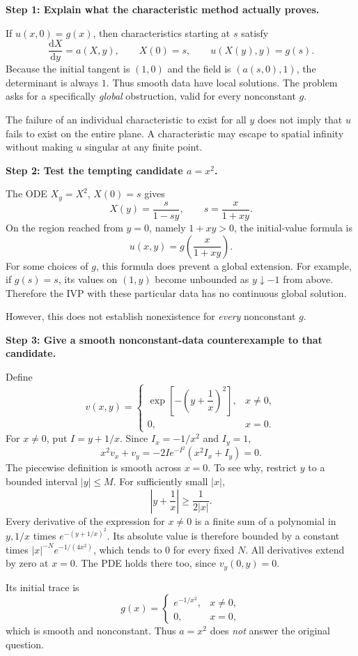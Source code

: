 \documentclass[11pt,a4paper]{article}
\newcommand{\step}[1]{\par\medskip\textbf{#1}\par}
\begin{document}
\step{Step 1: Explain what the characteristic method actually proves.}
If $u(x,0)=g(x)$, then characteristics starting at $s$ satisfy
\[
 \frac{\mathrm dX}{\mathrm dy}=a(X,y),\qquad X(0)=s,
 \qquad u(X(y),y)=g(s).
\]
Because the initial tangent is $(1,0)$ and the field is $(a(s,0),1)$, the determinant is always $1$. Thus smooth data have local solutions. The problem asks for a specifically \emph{global} obstruction, valid for every nonconstant $g$.

The failure of an individual characteristic to exist for all $y$ does not imply that $u$ fails to exist on the entire plane. A characteristic may escape to spatial infinity without making $u$ singular at any finite point.

\step{Step 2: Test the tempting candidate $a=x^2$.}
The ODE $X_y=X^2$, $X(0)=s$ gives
\[
 X(y)=\frac{s}{1-sy},\qquad
 s=\frac{x}{1+xy}.
\]
On the region reached from $y=0$, namely $1+xy>0$, the initial-value formula is
\[
 u(x,y)=g\!\left(\frac{x}{1+xy}\right).
\]
For some choices of $g$, this formula does prevent a global extension. For example, if $g(s)=s$, its values on $(1,y)$ become unbounded as $y\downarrow-1$ from above. Therefore the IVP with these particular data has no continuous global solution.

However, this does not establish nonexistence for \emph{every} nonconstant $g$.

\step{Step 3: Give a smooth nonconstant-data counterexample to that candidate.}
Define
\[
 v(x,y)=\begin{cases}
 \exp\!\left[-\left(y+\dfrac1x\right)^2\right],&x\ne0,\\[3pt]
 0,&x=0.
 \end{cases}
\]
For $x\ne0$, put $I=y+1/x$. Since $I_x=-1/x^2$ and $I_y=1$,
\[
 x^2v_x+v_y=-2I e^{-I^2}(x^2I_x+I_y)=0.
\]
The piecewise definition is smooth across $x=0$. To see why, restrict $y$ to a bounded interval $|y|\le M$. For sufficiently small $|x|$,
\[
 \left|y+\frac1x\right|\ge\frac1{2|x|}.
\]
Every derivative of the expression for $x\ne0$ is a finite sum of a polynomial in $y,1/x$ times $e^{-(y+1/x)^2}$. Its absolute value is therefore bounded by a constant times $|x|^{-N}e^{-1/(4x^2)}$, which tends to $0$ for every fixed $N$. All derivatives extend by zero at $x=0$. The PDE holds there too, since $v_y(0,y)=0$.

Its initial trace is
\[
 g(x)=\begin{cases}e^{-1/x^2},&x\ne0,\\0,&x=0,\end{cases}
\]
which is smooth and nonconstant. Thus $a=x^2$ does \emph{not} answer the original question.
\end{document}
